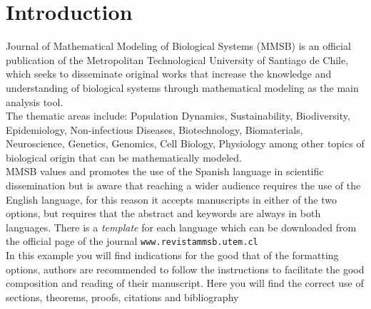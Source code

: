 \documentclass[eng]{MMSB-class-eng}
\begin{document}
\maketitle
\thispagestyle{fancy}

\newpage
\section{Introduction}
Journal of Mathematical Modeling of Biological Systems (MMSB) is an official publication of the Metropolitan Technological University of Santiago de Chile, which seeks to disseminate original works that increase the knowledge and understanding of biological systems through mathematical modeling as the main analysis tool.\\

The thematic areas include: Population Dynamics, Sustainability, Biodiversity, Epidemiology, Non-infectious Diseases, Biotechnology, Biomaterials, Neuroscience, Genetics, Genomics, Cell Biology, Physiology among other topics of biological origin that can be mathematically modeled.\\

MMSB values and promotes the use of the Spanish language in scientific dissemination but is aware that reaching a wider audience requires the use of the English language, for this reason it accepts manuscripts in either of the two options, but requires that the abstract and keywords are always in both languages. There is a \emph{template} for each language which can be downloaded from the official page of the journal \texttt{www.revistammsb.utem.cl}\\


In this example you will find indications for the good that of the formatting options, authors are recommended to follow the instructions to facilitate the good composition and reading of their manuscript. Here you will find the correct use of sections, theorems, proofs, citations and bibliography \\
\end{document}
